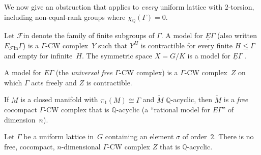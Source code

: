 We now give an obstruction that applies to \emph{every} uniform lattice with
$2$-torsion, including non-equal-rank groups where $\chi_\mathbb{Q}(\Gamma)=0$.

\begin{definition}
\label{def:p7-efin}
Let $\mathcal{F}\mathrm{in}$ denote the family of finite subgroups of $\Gamma$.
A model for $\underline{E}\Gamma$ (also written $E_{\mathcal{F}\mathrm{in}}\Gamma$)
is a $\Gamma$-CW complex~$Y$ such that
$Y^H$ is contractible for every finite $H\le\Gamma$ and empty for infinite~$H$.
The symmetric space $X=G/K$ is a model for $\underline{E}\Gamma$
\cite{BorelSerre73, LuckSurvey05}.
\end{definition}

\begin{definition}
A model for $E\Gamma$ (the \emph{universal free} $\Gamma$-CW complex) is a
$\Gamma$-CW complex~$Z$ on which $\Gamma$ acts freely and $Z$ is contractible.
\end{definition}

If $M$ is a closed manifold with $\pi_1(M)\cong\Gamma$ and
$\widetilde{M}$ $\mathbb{Q}$-acyclic, then $\widetilde{M}$ is a
\emph{free} cocompact $\Gamma$-CW complex that is $\mathbb{Q}$-acyclic
(a ``rational model for $E\Gamma$'' of dimension~$n$).

\begin{theorem}
\label{thm:p7-bredon-obstruction}
Let $\Gamma$ be a uniform lattice in~$G$ containing an element $\sigma$ of
order~$2$. There is no free, cocompact, $n$-dimensional $\Gamma$-CW complex
$Z$ that is $\mathbb{Q}$-acyclic.
\end{theorem}

